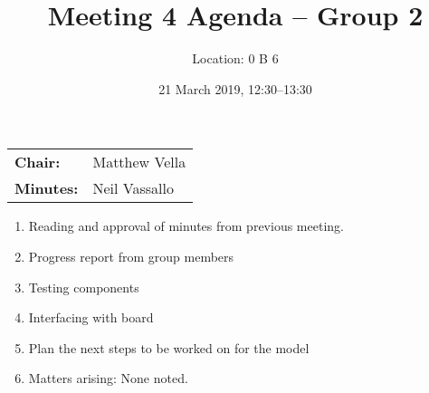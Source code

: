 \documentclass[11pt,a4paper]{article}
\title{Meeting 4 Agenda -- Group 2}
\author{Location: 0 B 6}
\date{21 March 2019, 12:30--13:30}
\begin{document}
\maketitle
\begin{center}
\begin{tabular}{ll}
\textbf{Chair:}   & Matthew Vella \\
\textbf{Minutes:} & Neil Vassallo
\end{tabular}
\end{center}

\begin{enumerate}

\item Reading and approval of minutes from previous meeting.

\item Progress report from group members

\item Testing components

\item Interfacing with board

\item Plan the next steps to be worked on for the model

\item Matters arising: None noted.

\end{enumerate}
\end{document}
